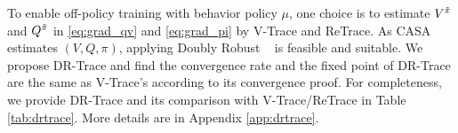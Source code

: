\begin{table}[ht!]
 \vskip -0.05in
    \centering
    \vspace{0.1cm}
    \caption{Comparison between DR-Trace and V-Trace/ReTrace.}
    \label{tab:drtrace}
 \vskip -0.05in
\end{table}


{ To enable off-policy training with behavior policy $\mu$}, one choice is to estimate $V^{\Tilde{\pi}}$ and $Q^{\Tilde{\pi}}$ in \eqref{eq:grad_qv} and \eqref{eq:grad_pi} by V-Trace and ReTrace. 
As CASA estimates $(V, Q, \pi)$, applying Doubly Robust ~\citep{dr} is feasible and suitable.
We propose DR-Trace and find the convergence rate and the fixed point of DR-Trace are the same as V-Trace's according to its convergence proof. 
For completeness, we provide DR-Trace and its comparison with V-Trace/ReTrace in Table \ref{tab:drtrace}. 
More details are in Appendix \ref{app:drtrace}.

